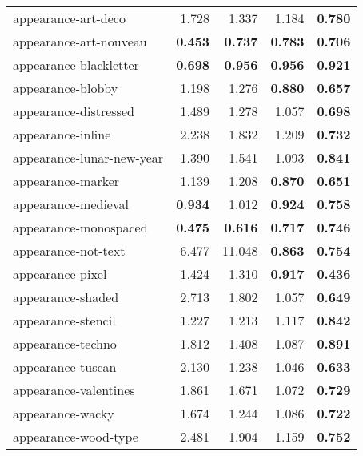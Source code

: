 \begin{longtable}{|l|r|r|r|r|}
appearance-art-deco       & 1.728          & 1.337          & 1.184          & \textbf{0.780} \\
appearance-art-nouveau    & \textbf{0.453} & \textbf{0.737} & \textbf{0.783} & \textbf{0.706} \\
appearance-blackletter    & \textbf{0.698} & \textbf{0.956} & \textbf{0.956} & \textbf{0.921} \\
appearance-blobby         & 1.198          & 1.276          & \textbf{0.880} & \textbf{0.657} \\
appearance-distressed     & 1.489          & 1.278          & 1.057          & \textbf{0.698} \\
appearance-inline         & 2.238          & 1.832          & 1.209          & \textbf{0.732} \\
appearance-lunar-new-year & 1.390          & 1.541          & 1.093          & \textbf{0.841} \\
appearance-marker         & 1.139          & 1.208          & \textbf{0.870} & \textbf{0.651} \\
appearance-medieval       & \textbf{0.934} & 1.012          & \textbf{0.924} & \textbf{0.758} \\
appearance-monospaced     & \textbf{0.475} & \textbf{0.616} & \textbf{0.717} & \textbf{0.746} \\
appearance-not-text       & 6.477          & 11.048         & \textbf{0.863} & \textbf{0.754} \\
appearance-pixel          & 1.424          & 1.310          & \textbf{0.917} & \textbf{0.436} \\
appearance-shaded         & 2.713          & 1.802          & 1.057          & \textbf{0.649} \\
appearance-stencil        & 1.227          & 1.213          & 1.117          & \textbf{0.842} \\
appearance-techno         & 1.812          & 1.408          & 1.087          & \textbf{0.891} \\
appearance-tuscan         & 2.130          & 1.238          & 1.046          & \textbf{0.633} \\
appearance-valentines     & 1.861          & 1.671          & 1.072          & \textbf{0.729} \\
appearance-wacky          & 1.674          & 1.244          & 1.086          & \textbf{0.722} \\
appearance-wood-type      & 2.481          & 1.904          & 1.159          & \textbf{0.752} \\

\end{longtable}
